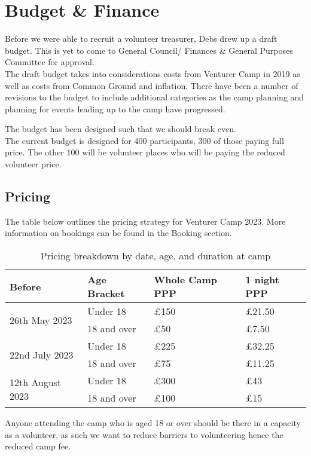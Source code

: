 \chapter{Budget \& Finance}

Before we were able to recruit a volunteer treasurer, Debs drew up a draft budget. This is yet to come to General Council/ Finances \& General Purposes Committee for approval.\\

The draft budget takes into considerations costs from Venturer Camp in 2019 as well as costs from Common Ground and inflation. There have been a number of revisions to the budget to include additional categories as the camp planning and planning for events leading up to the camp have progressed.

The budget has been designed such that we should break even.\\

The current budget is designed for 400 participants, 300 of those paying full price. The other 100 will be volunteer places who will be paying the reduced volunteer price.\\

\section{Pricing}
The table below outlines the pricing strategy for Venturer Camp 2023. More information on bookings can be found in the Booking section.
\begin{table}[H]
    \begin{tabularx}{\textwidth}{XXXX}
        \textbf{Before} & \textbf{Age Bracket} & \textbf{Whole Camp PPP} & \textbf{1 night PPP}\\
        \hline
        \hline
        \multirow{2}{*}{26th May 2023} & Under 18 & £150 & £21.50\\
        \cline{2-4}
         & 18 and over & £50 & £7.50\\
        \hline
        \multirow{2}{*}{22nd July 2023} & Under 18 & £225 & £32.25\\
        \cline{2-4}
         & 18 and over & £75 & £11.25\\
        \hline
        \multirow{2}{*}{12th August 2023} & Under 18 & £300 & £43\\
        \cline{2-4}
         & 18 and over & £100 & £15\\
        \hline
    \end{tabularx}
    \caption{Pricing breakdown by date, age, and duration at camp}
\end{table}

Anyone attending the camp who is aged 18 or over should be there in a capacity as a volunteer, as such we want to reduce barriers to volunteering hence the reduced camp fee. 